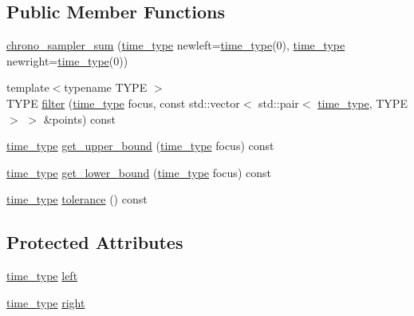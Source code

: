 \subsection*{Public Member Functions}
\begin{DoxyCompactItemize}
\item 
\hyperlink{classmui_1_1chrono__sampler__sum_a6422f7fbef2d39c191eb56a8b167df46}{chrono\+\_\+sampler\+\_\+sum} (\hyperlink{classmui_1_1chrono__sampler__sum_ada1a39bc0845e79c00e7aed8b55e8fb2}{time\+\_\+type} newleft=\hyperlink{classmui_1_1chrono__sampler__sum_ada1a39bc0845e79c00e7aed8b55e8fb2}{time\+\_\+type}(0), \hyperlink{classmui_1_1chrono__sampler__sum_ada1a39bc0845e79c00e7aed8b55e8fb2}{time\+\_\+type} newright=\hyperlink{classmui_1_1chrono__sampler__sum_ada1a39bc0845e79c00e7aed8b55e8fb2}{time\+\_\+type}(0))
\item 
{\footnotesize template$<$typename T\+Y\+PE $>$ }\\T\+Y\+PE \hyperlink{classmui_1_1chrono__sampler__sum_a1c018603cc6587c48996a89de0871a0f}{filter} (\hyperlink{classmui_1_1chrono__sampler__sum_ada1a39bc0845e79c00e7aed8b55e8fb2}{time\+\_\+type} focus, const std\+::vector$<$ std\+::pair$<$ \hyperlink{classmui_1_1chrono__sampler__sum_ada1a39bc0845e79c00e7aed8b55e8fb2}{time\+\_\+type}, T\+Y\+PE $>$ $>$ \&points) const
\item 
\hyperlink{classmui_1_1chrono__sampler__sum_ada1a39bc0845e79c00e7aed8b55e8fb2}{time\+\_\+type} \hyperlink{classmui_1_1chrono__sampler__sum_ad63fb80d5015358d609b91cf8707ab97}{get\+\_\+upper\+\_\+bound} (\hyperlink{classmui_1_1chrono__sampler__sum_ada1a39bc0845e79c00e7aed8b55e8fb2}{time\+\_\+type} focus) const
\item 
\hyperlink{classmui_1_1chrono__sampler__sum_ada1a39bc0845e79c00e7aed8b55e8fb2}{time\+\_\+type} \hyperlink{classmui_1_1chrono__sampler__sum_a197cfd23da3c02957e466a4aace52bcb}{get\+\_\+lower\+\_\+bound} (\hyperlink{classmui_1_1chrono__sampler__sum_ada1a39bc0845e79c00e7aed8b55e8fb2}{time\+\_\+type} focus) const
\item 
\hyperlink{classmui_1_1chrono__sampler__sum_ada1a39bc0845e79c00e7aed8b55e8fb2}{time\+\_\+type} \hyperlink{classmui_1_1chrono__sampler__sum_a7a71a456a96f161fa91104f8e4696b99}{tolerance} () const
\end{DoxyCompactItemize}
\subsection*{Protected Attributes}
\begin{DoxyCompactItemize}
\item 
\hyperlink{classmui_1_1chrono__sampler__sum_ada1a39bc0845e79c00e7aed8b55e8fb2}{time\+\_\+type} \hyperlink{classmui_1_1chrono__sampler__sum_a4c7a8436e5562dca7d9851356817d7b6}{left}
\item 
\hyperlink{classmui_1_1chrono__sampler__sum_ada1a39bc0845e79c00e7aed8b55e8fb2}{time\+\_\+type} \hyperlink{classmui_1_1chrono__sampler__sum_ac01675e14851c5b9ed2dfe1c2d3847d9}{right}
\end{DoxyCompactItemize}



